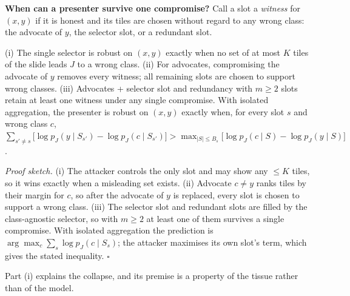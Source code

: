 \documentclass[runningheads]{llncs}
\begin{document}
\textbf{When can a presenter survive one compromise?} Call a slot a \emph{witness} for $(x,y)$ if it is honest and its tiles are chosen without regard to any wrong class: the advocate of $y$, the selector slot, or a redundant slot.
\begin{proposition}\label{prop:witness}
(i) The single selector is robust on $(x,y)$ exactly when no set of at most $K$ tiles of the slide leads $J$ to a wrong class. (ii) For advocates, compromising the advocate of $y$ removes every witness; all remaining slots are chosen to support wrong classes. (iii) Advocates + selector slot and redundancy with $m\ge2$ slots retain at least one witness under any single compromise. With isolated aggregation, the presenter is robust on $(x,y)$ exactly when, for every slot $s$ and wrong class $c$, $\sum_{s'\neq s}\big[\log p_J(y\mid S_{s'})-\log p_J(c\mid S_{s'})\big] > \max_{|S|\le B_s}\big[\log p_J(c\mid S)-\log p_J(y\mid S)\big]$.
\end{proposition}
\emph{Proof sketch.} (i) The attacker controls the only slot and may show any $\le K$ tiles, so it wins exactly when a misleading set exists. (ii) Advocate $c\neq y$ ranks tiles by their margin for $c$, so after the advocate of $y$ is replaced, every slot is chosen to support a wrong class. (iii) The selector slot and redundant slots are filled by the class-agnostic selector, so with $m\ge2$ at least one of them survives a single compromise. With isolated aggregation the prediction is $\arg\max_c\sum_{s}\log p_J(c\mid S_s)$; the attacker maximises its own slot's term, which gives the stated inequality. $\square$

Part (i) explains the collapse, and its premise is a property of the tissue rather than of the model.
\end{document}

